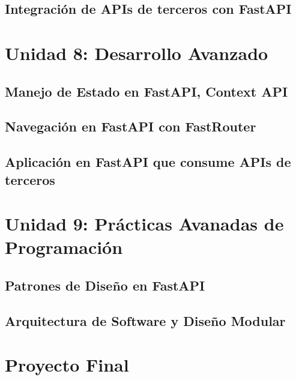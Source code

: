 \documentclass[
  a4paper,
  DIV=11,
  numbers=noendperiod,
  onepage,
  openany]{scrreprt}
\begin{document}
\chapter{Integración de APIs de terceros con
FastAPI}\label{integraciuxf3n-de-apis-de-terceros-con-fastapi}

\part{Unidad 8: Desarrollo Avanzado}

\chapter{Manejo de Estado en FastAPI, Context
API}\label{manejo-de-estado-en-fastapi-context-api}

\chapter{Navegación en FastAPI con
FastRouter}\label{navegaciuxf3n-en-fastapi-con-fastrouter}

\chapter{Aplicación en FastAPI que consume APIs de
terceros}\label{aplicaciuxf3n-en-fastapi-que-consume-apis-de-terceros}

\part{Unidad 9: Prácticas Avanadas de Programación}

\chapter{Patrones de Diseño en
FastAPI}\label{patrones-de-diseuxf1o-en-fastapi}

\chapter{Arquitectura de Software y Diseño
Modular}\label{arquitectura-de-software-y-diseuxf1o-modular}

\part{Proyecto Final}

\chapter{}\label{section}
\end{document}
